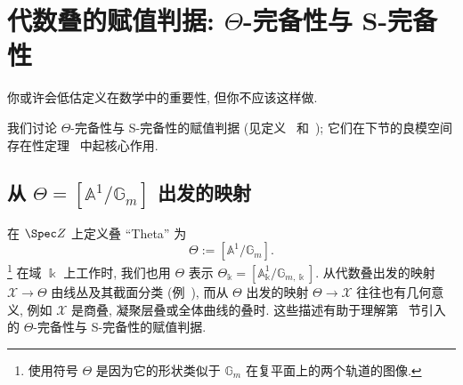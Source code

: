 \section{代数叠的赋值判据: \texorpdfstring{$\Theta$}{Θ}-完备性与 S-完备性}\label{src:7.9}
\begin{epigraph}
你或许会低估定义在数学中的重要性, 但你不应该这样做.
\end{epigraph}
我们讨论 $\Theta$-完备性与 S-完备性的赋值判据 (见定义~ 和~); 它们在下节的良模空间存在性定理~ 中起核心作用.
\subsection{从 \texorpdfstring{$\Theta=[\mathbb A^1/\mathbb G_m]$}{Θ=[A1/Gm]} 出发的映射}\label{src:7.9.1-subsection}
在 $\Spec\mathbb Z$ 上定义叠 ``Theta'' 为
\[\Theta:=[\mathbb A^1/\mathbb G_m].\]
\footnote{使用符号 $\Theta$ 是因为它的形状类似于 $\mathbb G_m$ 在复平面上的两个轨道的图像.}
在域 $\Bbbk$ 上工作时, 我们也用 $\Theta$ 表示 $\Theta_{\Bbbk}=[\mathbb A^1_{\Bbbk}/\mathbb G_{m,\Bbbk}]$. 从代数叠出发的映射 $\mathcal X\to\Theta$ 由线丛及其截面分类 (例~), 而从 $\Theta$ 出发的映射 $\Theta\to\mathcal X$ 往往也有几何意义, 例如 $\mathcal X$ 是商叠, 凝聚层叠或全体曲线的叠时. 这些描述有助于理解第~ 节引入的 $\Theta$-完备性与 S-完备性的赋值判据.

